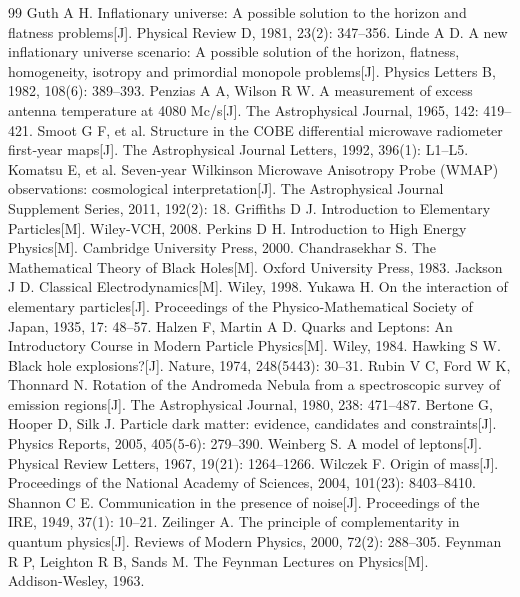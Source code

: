 \documentclass[UTF8]{csoarticle}
\begin{document}
\begin{thebibliography}{99}
 Guth A H. Inflationary universe: A possible solution to the horizon and flatness problems[J]. Physical Review D, 1981, 23(2): 347–356.
 Linde A D. A new inflationary universe scenario: A possible solution of the horizon, flatness, homogeneity, isotropy and primordial monopole problems[J]. Physics Letters B, 1982, 108(6): 389–393.
 Penzias A A, Wilson R W. A measurement of excess antenna temperature at 4080 Mc/s[J]. The Astrophysical Journal, 1965, 142: 419–421.
 Smoot G F, et al. Structure in the COBE differential microwave radiometer first‑year maps[J]. The Astrophysical Journal Letters, 1992, 396(1): L1–L5.
 Komatsu E, et al. Seven‑year Wilkinson Microwave Anisotropy Probe (WMAP) observations: cosmological interpretation[J]. The Astrophysical Journal Supplement Series, 2011, 192(2): 18.
 Griffiths D J. Introduction to Elementary Particles[M]. Wiley‑VCH, 2008.
 Perkins D H. Introduction to High Energy Physics[M]. Cambridge University Press, 2000.
 Chandrasekhar S. The Mathematical Theory of Black Holes[M]. Oxford University Press, 1983.
 Jackson J D. Classical Electrodynamics[M]. Wiley, 1998.
 Yukawa H. On the interaction of elementary particles[J]. Proceedings of the Physico‑Mathematical Society of Japan, 1935, 17: 48–57.
 Halzen F, Martin A D. Quarks and Leptons: An Introductory Course in Modern Particle Physics[M]. Wiley, 1984.
 Hawking S W. Black hole explosions?[J]. Nature, 1974, 248(5443): 30–31.
 Rubin V C, Ford W K, Thonnard N. Rotation of the Andromeda Nebula from a spectroscopic survey of emission regions[J]. The Astrophysical Journal, 1980, 238: 471–487.
 Bertone G, Hooper D, Silk J. Particle dark matter: evidence, candidates and constraints[J]. Physics Reports, 2005, 405(5‑6): 279–390.
 Weinberg S. A model of leptons[J]. Physical Review Letters, 1967, 19(21): 1264–1266.
 Wilczek F. Origin of mass[J]. Proceedings of the National Academy of Sciences, 2004, 101(23): 8403–8410.
 Shannon C E. Communication in the presence of noise[J]. Proceedings of the IRE, 1949, 37(1): 10–21.
 Zeilinger A. The principle of complementarity in quantum physics[J]. Reviews of Modern Physics, 2000, 72(2): 288–305.
 Feynman R P, Leighton R B, Sands M. The Feynman Lectures on Physics[M]. Addison‑Wesley, 1963.

\end{thebibliography}
\end{document}
